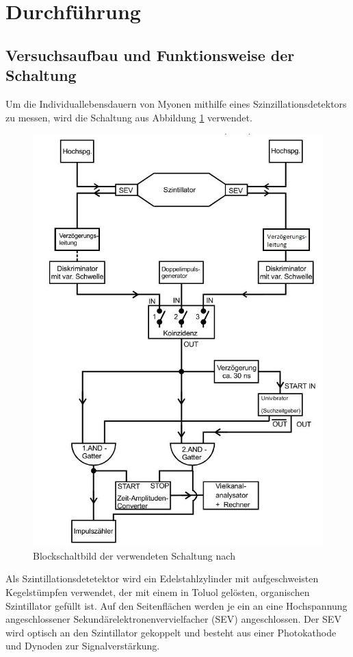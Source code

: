 \section{Durchführung}
\label{sec:Durchführung}
\subsection{Versuchsaufbau und Funktionsweise der Schaltung}
\label{sub:aufbau}
Um die Individuallebensdauern von Myonen mithilfe eines Szinzillationsdetektors zu messen, wird die Schaltung aus Abbildung \ref{fig:schaltung} verwendet.
\begin{figure}[H]
  \centering
  \includegraphics{./content/blockschaltbild.JPG}
  \caption{Blockschaltbild der verwendeten Schaltung nach \cite{Anleitung}}
  \label{fig:schaltung}
\end{figure}
Als Szintillationsdetetektor wird ein Edelstahlzylinder mit aufgeschweisten Kegelstümpfen verwendet, der mit einem in Toluol gelösten, organischen Szintillator gefüllt ist. Auf den Seitenflächen werden je ein an eine Hochspannung angeschlossener Sekundärelektronenvervielfacher (SEV) angeschlossen. Der SEV wird optisch an den Szintillator gekoppelt und besteht aus einer Photokathode und Dynoden zur Signalverstärkung.\\
